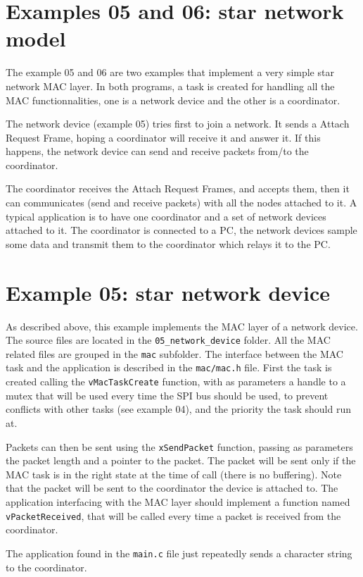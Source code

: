 \documentclass[11pt]{report}
\begin{document}
\section{Examples 05 and 06: star network model}

The example 05 and 06 are two examples that implement a very simple star network MAC layer. In both programs, a task is created for handling all the MAC functionnalities, one is a network device and the other is a coordinator.

The network device (example 05) tries first to join a network. It sends a Attach Request Frame, hoping a coordinator will receive it and answer it. If this happens, the network device can send and receive packets from/to the coordinator.

The coordinator receives the Attach Request Frames, and accepts them, then it can communicates (send and receive packets) with all the nodes attached to it. A typical application is to have one coordinator and a set of network devices attached to it. The coordinator is connected to a PC, the network devices sample some data and transmit them to the coordinator which relays it to the PC.

\section{Example 05: star network device}
As described above, this example implements the MAC layer of a network device. The source files are located in the \verb$05_network_device$ folder. All the MAC related files are grouped in the \verb$mac$ subfolder. The interface between the MAC task and the application is described in the \verb$mac/mac.h$ file. First the task is created calling the \verb$vMacTaskCreate$ function, with as parameters a handle to a mutex that will be used every time the SPI bus should be used, to prevent conflicts with other tasks (see example 04), and the priority the task should run at.

Packets can then be sent using the \verb$xSendPacket$ function, passing as parameters the packet length and a pointer to the packet. The packet will be sent only if the MAC task is in the right state at the time of call (there is no buffering). Note that the packet will be sent to the coordinator the device is attached to. The application interfacing with the MAC layer should implement a function named \verb$vPacketReceived$, that will be called every time a packet is received from the coordinator.

The application found in the \verb?main.c? file just repeatedly sends a character string to the coordinator.
\end{document}
